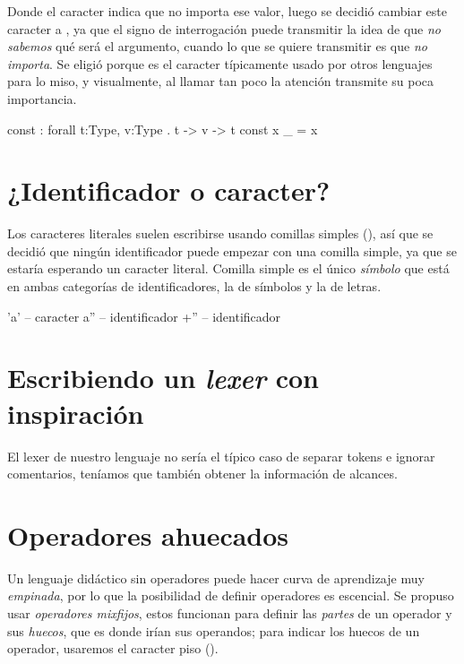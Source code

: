 {\begin{designfr}
Donde el caracter  indica que no importa ese valor, luego se decidió cambiar este caracter a \inlinecode{\_}, ya que el signo de interrogación puede transmitir la idea de que \emph{no sabemos} qué será el argumento, cuando lo que se quiere transmitir es que \emph{no importa}. Se eligió \inlinecode{\_} porque es el caracter típicamente usado por otros lenguajes para lo miso, y visualmente, al llamar tan poco la atención transmite su poca importancia.

\begin{anglercode}
const : forall t:Type, v:Type . t -> v -> t
const x _ = x
\end{anglercode}
\end{designfr}

\section{¿Identificador o caracter?}

\begin{designfr}
Los caracteres literales suelen escribirse usando comillas simples (), así que se decidió que ningún identificador puede empezar con una comilla simple, ya que se estaría esperando un caracter literal. Comilla simple es el único \emph{símbolo} que está en ambas categorías de identificadores, la de símbolos y la de letras.

\begin{anglercode}
'a'     -- caracter
a''     -- identificador
+''     -- identificador
\end{anglercode}
\end{designfr}

\section{Escribiendo un \emph{lexer} con inspiración}

\begin{implementationfr}
El lexer de nuestro lenguaje no sería el típico caso de separar tokens e ignorar comentarios, teníamos que también obtener la información de alcances.
\end{implementationfr}

\section{Operadores ahuecados}

\begin{designfr}
Un lenguaje didáctico sin operadores puede hacer curva de aprendizaje muy \emph{empinada}, por lo que la posibilidad de definir operadores es escencial. Se propuso usar \emph{operadores mixfijos}, estos funcionan para definir las \emph{partes} de un operador y sus \emph{huecos}, que es donde irían sus operandos; para indicar los huecos de un operador, usaremos el caracter piso (\inlinecode{\_}).


\end{designfr}}
